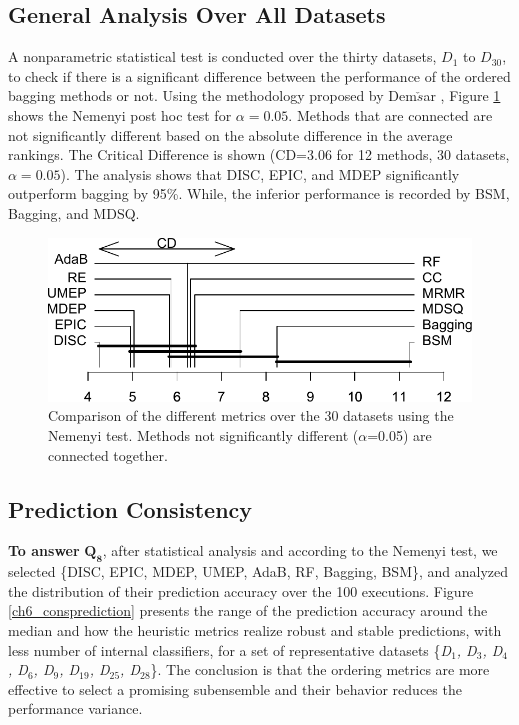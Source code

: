 \subsection{General Analysis Over All Datasets}\label{overall}
 A nonparametric statistical test is conducted over the thirty datasets, $D_1$ to $D_{30}$, to check if there is a significant difference between the performance of the ordered bagging methods or not. Using the methodology proposed by Dem$\check{s}$ar \cite{demvsar2006},  Figure \ref{Nemenyi} shows the Nemenyi post hoc test for $\alpha=0.05$. Methods that are connected are not significantly different based on the absolute difference in the average rankings. The  Critical Difference is shown (CD=3.06 for 12 methods, 30 datasets, $\alpha=0.05$). The analysis shows that DISC, EPIC, and MDEP significantly outperform bagging by 95\%. While, the inferior performance is recorded by BSM, Bagging, and MDSQ.  

\begin{figure}[!ht]
\centering\scriptsize
\includegraphics[width=.8\textwidth]{6_analysis/fig/Nemenyi.pdf}
\caption{Comparison of the different metrics over the 30 datasets using the Nemenyi test. Methods not significantly different ($\alpha$=0.05) are connected together.}
\label{Nemenyi}
\end{figure}

\subsection{Prediction Consistency} \label{precision.con}
\textbf{To answer} $\pmb{Q_8}$, after statistical analysis and according to the Nemenyi test, we selected \{DISC, EPIC, MDEP, UMEP, AdaB, RF, Bagging, BSM\}, and analyzed the distribution of their prediction accuracy over the 100 executions. Figure \ref{ch6_consprediction} presents the range of the prediction accuracy around the median and how the heuristic metrics realize robust and stable predictions, with less number of internal classifiers, for a set of representative datasets \{\textit{D$_1$, D$_3$, D$_4$, D$_6$, D$_9$, D$_{19}$, D$_{25}$, D$_{28}$}\}. The conclusion is that the ordering metrics are more effective to select a promising subensemble and their behavior reduces the performance variance. 

